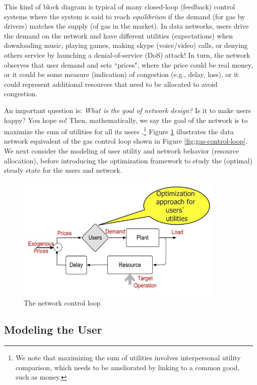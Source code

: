 \documentclass{article}
\begin{document}
This kind of block diagram is typical of many closed-loop (feedback) control systems where the system is said to reach {\em equilibrium} if the demand (for gas by drivers) matches the supply (of gas in the market). In data networks, users drive the demand on the network and have different utilities (expectations) when downloading music, playing games, making skype (voice/video) calls, or denying others service by launching a denial-of-service (DoS) attack! In turn, the network observes that user demand and sets ``prices", where the price could be real money, or it could be some measure (indication) of congestion (e.g., delay, loss), or it could represent additional resources that need to be allocated to avoid congestion. 

An important question is: {\em What is the goal of network design?} Is it to make users happy? You hope so! Then, mathematically, we say the goal of the network is to maximize the sum of utilities for all its users \cite{elastic:2006}.\footnote{We note that maximizing the sum of utilities involves interpersonal utility comparison, which needs to be ameliorated by linking to a common good, such as money.} Figure \ref{fig:net-control-loop} illustrates the data network equivalent of the gas control loop shown in Figure \ref{fig:gas-control-loop}. We next consider the modeling of user utility and network behavior (resource allocation), before introducing the optimization framework to study the (optimal) steady state for the users and network.


\begin{figure}[htbp] %
   \centering
   \includegraphics[width=4in]{figures/net-control-loop.jpg} 
   \caption{The network control loop}
   \label{fig:net-control-loop}
\end{figure}


\subsection{Modeling the User}
\end{document}
